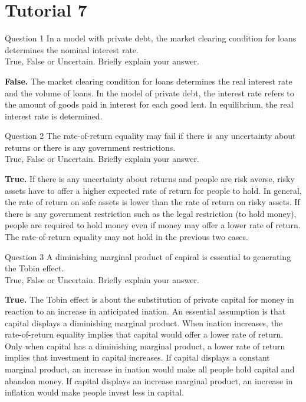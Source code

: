 \documentclass[a4paper]{article}
\newif\IfInSansMode
\numberwithin{equation}{section}
\numberwithin{figure}{section}
\begin{document}
\section{Tutorial 7}
	\begin{questionbox}{Question 1}
		In a model with private debt, the market clearing condition for loans determines the nominal interest rate.\\
		True, False or Uncertain. Briefly explain your answer.
		\begin{explanationbox}
			\textbf{False.} The market clearing condition for loans determines the real interest rate and the volume of loans. In the model of private debt, the interest rate refers to the amount of goods paid in interest for each good lent. In equilibrium, the real interest rate is determined.
		\end{explanationbox}
	\end{questionbox}
	\begin{questionbox}{Question 2}
		The rate-of-return equality may fail if there is any uncertainty about returns or there is any government restrictions.\\
		True, False or Uncertain. Briefly explain your answer.
		\begin{explanationbox}
			\textbf{True.} If there is any uncertainty about returns and people are risk averse, risky assets have to offer a higher expected rate of return for people to hold. In general, the rate of return on safe assets is lower than the rate of return on risky assets. If there is any government restriction such as the legal restriction (to hold money), people are required to hold money even if money may offer a lower rate of return. The rate-of-return equality may not hold in the previous two cases.
		\end{explanationbox}
	\end{questionbox}
	\begin{questionbox}{Question 3}
		A diminishing marginal product of capiral is essential to generating the Tobin effect.\\
		True, False or Uncertain. Briefly explain your answer.
		\begin{explanationbox}
			\textbf{True.} The Tobin effect is about the substitution of private capital for money in reaction to an increase in anticipated ination. An essential assumption is that capital displays a diminishing marginal product. When ination increases, the rate-of-return equality implies that capital would offer a lower rate of return. Only when capital has a diminishing marginal product, a lower rate of return implies that investment in capital increases. If capital displays a constant marginal product, an increase in ination would make all people hold capital and abandon money. If capital displays an increase marginal product, an increase in inflation would make people invest less in capital.
		\end{explanationbox}
	\end{questionbox}
\end{document}
